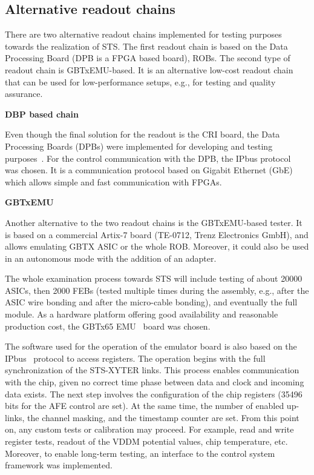 \subsection{Alternative readout chains}
\label{tester}
There are two alternative readout chains implemented for testing purposes towards the realization of \gls{STS}. The first readout chain is based on the Data Processing Board (\gls{DPB} is a \gls{FPGA} based board), \glspl{ROB}. The second type of readout chain is GBTxEMU-based. It is an alternative low-cost readout chain that can be used for
low-performance setups, e.g., for testing and quality assurance. \bigbreak


\textbf{DBP based chain}\bigbreak


Even though the final solution for the readout is the \gls{CRI} board, the Data Processing Boards (\glspl{DPB}) were implemented for developing and testing purposes~\cite{Loizeau}. For the control communication with the \gls{DPB}, the IPbus protocol~\cite{ipbus} was chosen. It is a communication protocol based on Gigabit Ethernet (GbE) which allows simple and fast communication with \glspl{FPGA}.

\textbf{GBTxEMU} \bigbreak


Another alternative to the two readout chains is the GBTxEMU-based tester. It is based on a commercial Artix-7 board (TE-0712, Trenz Electronics GmbH), and allows emulating GBTX ASIC or the whole \gls{ROB}. Moreover, it could also be used in an autonomous mode with the addition of an adapter.


The whole examination process towards \gls{STS} will include testing of about 20000 \glspl{ASIC}, then 2000 \glspl{FEB} (tested  multiple times during the assembly, e.g., after the \gls{ASIC} wire bonding and after the micro-cable bonding), and eventually the full module. As a hardware platform offering good availability and reasonable production cost, the GBTx65 EMU~\cite{zabolotny1} board was chosen.

The software used for the operation of the emulator board is also based on the IPbus~\cite{ipbus} protocol to access registers.
The operation begins with the full synchronization of the STS-XYTER links. This process enables communication with the chip, given no correct time phase between data and clock and incoming data exists. The next step involves the configuration of the chip registers (35496 bits for the AFE control are set). At the same time, the number of enabled up-links, the channel masking, and the timestamp counter are set.  From this point on, any custom tests or calibration may proceed. For example, read and write register tests, readout of the VDDM potential values, chip temperature, etc. Moreover, to enable long-term testing, an interface to the control system framework was implemented.

